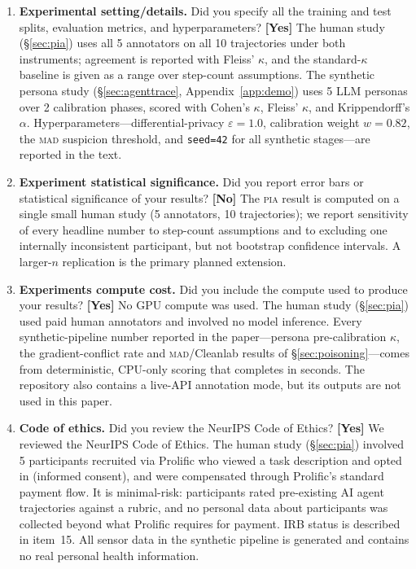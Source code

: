 \documentclass{article}
\newcommand{\PIA}{\textsc{pia}}          %
\newcommand{\answerYes}[1]{\textbf{[Yes]} #1}
\newcommand{\answerNo}[1]{\textbf{[No]} #1}
\begin{document}
\begin{enumerate}
\item[\textbf{6.}] \textbf{Experimental setting/details.}
Did you specify all the training and test splits, evaluation metrics,
and hyperparameters?
\answerYes{The human study (\S\ref{sec:pia}) uses all 5 annotators on all
  10 trajectories under both instruments; agreement is reported with Fleiss'
  $\kappa$, and the standard-$\kappa$ baseline is given as a range over
  step-count assumptions. The synthetic persona study (\S\ref{sec:agenttrace},
  Appendix~\ref{app:demo}) uses 5 LLM personas over 2 calibration phases,
  scored with Cohen's $\kappa$, Fleiss' $\kappa$, and Krippendorff's
  $\alpha$. Hyperparameters---differential-privacy $\varepsilon{=}1.0$,
  calibration weight $w{=}0.82$, the \textsc{mad} suspicion threshold, and
  \texttt{seed=42} for all synthetic stages---are reported in the text.}

\item[\textbf{7.}] \textbf{Experiment statistical significance.}
Did you report error bars or statistical significance of your results?
\answerNo{The \PIA{} result is computed on a single small human study
  (5 annotators, 10 trajectories); we report sensitivity of every headline
  number to step-count assumptions and to excluding one internally
  inconsistent participant, but not bootstrap confidence intervals. A
  larger-$n$ replication is the primary planned extension.}

\item[\textbf{8.}] \textbf{Experiments compute cost.}
Did you include the compute used to produce your results?
\answerYes{No GPU compute was used. The human study (\S\ref{sec:pia}) used
  paid human annotators and involved no model inference. Every
  synthetic-pipeline number reported in the paper---persona pre-calibration
  $\kappa$, the gradient-conflict rate and \textsc{mad}/{}Cleanlab results of
  \S\ref{sec:poisoning}---comes from deterministic, CPU-only scoring that
  completes in seconds. The repository also contains a live-API annotation
  mode, but its outputs are not used in this paper.}

\item[\textbf{9.}] \textbf{Code of ethics.}
Did you review the NeurIPS Code of Ethics?
\answerYes{We reviewed the NeurIPS Code of Ethics. The human study
  (\S\ref{sec:pia}) involved 5 participants recruited via Prolific who viewed
  a task description and opted in (informed consent), and were compensated
  through Prolific's standard payment flow. It is minimal-risk: participants
  rated pre-existing AI agent trajectories against a rubric, and no personal
  data about participants was collected beyond what Prolific requires for
  payment. IRB status is described in item~15. All sensor data in the
  synthetic pipeline is generated and contains no real personal health
  information.}


\end{enumerate}
\end{document}

